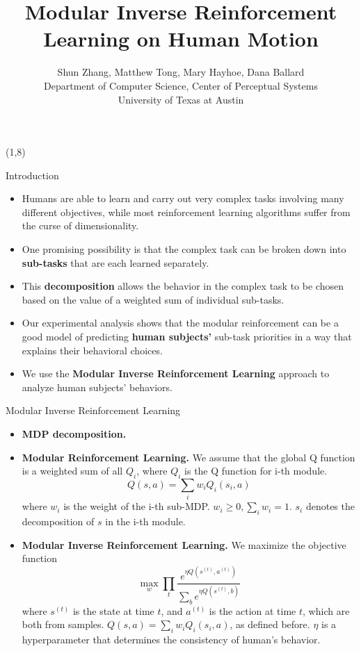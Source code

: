 \documentclass[final]{beamer}
\title{Modular Inverse Reinforcement Learning on Human Motion}
\author{Shun Zhang, Matthew Tong, Mary Hayhoe, Dana Ballard\\
Department of Computer Science, Center of Perceptual Systems\\
University of Texas at Austin}
\begin{document}
\begin{frame}{} 

\begin{textblock}{37}(1,8)
\begin{block}{Introduction}
\begin{itemize}
\item
Humans are able to learn and carry out very complex tasks involving 
many different objectives, while most reinforcement learning algorithms suffer
from the curse of dimensionality.
\item
One promising possibility is that the complex task can be broken down into 
{\bf sub-tasks} that are each learned separately.
\item
This {\bf decomposition} allows the behavior in the complex task to be chosen based on
the value of a weighted sum of individual sub-tasks.
\item
Our experimental analysis shows that the modular reinforcement can be a 
good model of predicting {\bf human subjects'} sub-task priorities in a way that
explains their behavioral choices.
\item
We use the {\bf Modular Inverse Reinforcement Learning} approach to analyze
human subjects' behaviors.
\end{itemize}
\end{block}

\begin{block}{Modular Inverse Reinforcement Learning}
\begin{itemize}
\item {\bf MDP decomposition.}
\item {\bf Modular Reinforcement Learning.}
We assume that the global Q function is a weighted
sum of all $Q_i$, where $Q_i$ is the Q function for i-th module.
$$Q(s, a) = \sum_i w_i Q_i (s_i, a)$$
where $w_i$ is the weight of the i-th sub-MDP. $w_i \geq 0, \sum_i w_i = 1$.
$s_i$ denotes the decomposition of $s$ in the i-th module.
\item {\bf Modular Inverse Reinforcement Learning.}
We maximize the objective function
$$\max_w \prod_t \frac{e^{\eta Q(s^{(t)}, a^{(t)})}}{\sum_b e^{\eta Q(s^{(t)},
b)}}$$
where $s^{(t)}$ is the state at time $t$, and $a^{(t)}$ is the action at time
$t$, which are both from samples. $Q(s, a) = \sum_i w_i Q_i(s_i, a)$, as defined
before. $\eta$ is a hyperparameter that determines the consistency of human's
behavior.
\end{itemize}
\end{block}
\end{textblock}


\end{frame}
\end{document}

